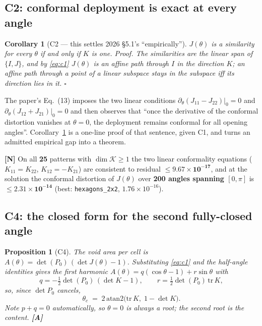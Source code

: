 \documentclass[11pt,a4paper]{article}
\newtheorem{proposition}[theorem]{Proposition}
\newtheorem{corollary}[theorem]{Corollary}
\theoremstyle{definition}
\newcommand{\file}[1]{\texttt{\small #1}}
\begin{document}
\subsection{C2: conformal deployment is exact at every angle}

\begin{corollary}[C2 --- this settles 2026 §5.1's ``empirically'']
\label{cor:c2}
$J(\theta)$ is a similarity for \emph{every} $\theta$ if and only if $K$ is one. \emph{Proof.}
The similarities are the linear span of $\{I,J\}$, and by \eqref{eq:c1} $J(\theta)$ is an
affine path through $I$ in the direction $K$; an affine path through a point of a linear
subspace stays in the subspace iff its direction lies in it. \hfill$\square$
\end{corollary}

\noindent The paper's Eq.~(13) imposes the two linear conditions
$\partial_\theta(J_{11}-J_{22})|_0=0$ and $\partial_\theta(J_{12}+J_{21})|_0=0$ and then
observes that ``once the derivative of the conformal distortion vanishes at $\theta=0$, the
deployment remains conformal for all opening angles''. Corollary~\ref{cor:c2} is a one-line
proof of that sentence, given C1, and turns an admitted empirical gap into a theorem.

\textbf{[N]} On all \textbf{25} patterns with $\dim\mathcal{K}\ge1$ the two linear
conformality equations ($K_{11}=K_{22}$, $K_{12}=-K_{21}$) are consistent to residual
$\le\mathbf{9.67\times10^{-17}}$, and at the solution the conformal distortion of $J(\theta)$
over \textbf{200 angles spanning $[0,\pi]$} is $\le\mathbf{2.31\times10^{-14}}$ (best:
\file{hexagons\_2x2}, $1.76\times10^{-16}$).

\subsection{C4: the closed form for the second fully-closed angle}

\begin{proposition}[C4]
The void area per cell is $A(\theta)=\det(P_0)\,(\det J(\theta)-1)$. Substituting
\eqref{eq:c1} and the half-angle identities gives the first harmonic
$A(\theta)=q(\cos\theta-1)+r\sin\theta$ with
\[
q = -\tfrac12\det(P_0)\,(\det K-1),\qquad
r = \tfrac12\det(P_0)\,\mathrm{tr}\,K,
\]
so, since $\det P_0$ cancels,
\begin{equation}
\boxed{\;\theta_c \;=\; 2\,\mathrm{atan2}\bigl(\mathrm{tr}\,K,\; 1-\det K\bigr).\;}
\label{eq:thetac}
\end{equation}
Note $p+q=0$ automatically, so $\theta=0$ is always a root; the second root is the content.
\textbf{[A]}
\end{proposition}
\end{document}
